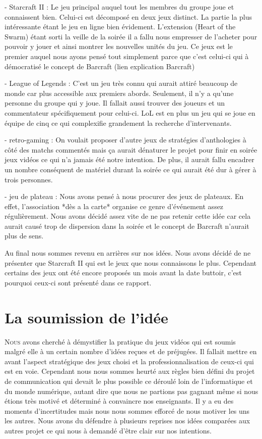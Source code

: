 - Starcraft II : Le jeu principal auquel tout les membres du groupe joue
et connaissent bien. Celui-ci est décomposé en deux jeux distinct.  La
partie la plus intéressante étant le jeu en ligne bien évidement.
L'extension (Heart of the Swarm) étant sorti la veille de la soirée il a
fallu nous empresser de l'acheter pour pouvoir y jouer et ainsi montrer
les nouvelles unités du jeu. Ce jeux est le premier auquel nous ayons
pensé tout simplement parce que c'est celui-ci qui à démocratisé le
concept de Barcraft (lien explication Barcraft)

- League of Legends : C'est un jeu très connu qui aurait attiré beaucoup
de monde car plus accessible aux premiers abords. Seulement, il n'y a
qu'une personne du groupe qui y joue. Il fallait aussi trouver des
joueurs et un commentateur spécifiquement pour celui-ci. LoL est en plus
un jeu qui se joue en équipe de cinq ce qui complexifie grandement la
recherche d'intervenants.

- retro-gaming : On voulait proposer d'autre jeux de stratégies
d'anthologies à côté des matchs commentés mais ça aurait dénaturer le
projet pour finir en soirée jeux vidéos ce qui n'a jamais été notre
intention. De plus, il aurait fallu encadrer un nombre conséquent de
matériel durant la soirée ce qui aurait été dur à gérer à trois
personnes.

- jeu de plateau : Nous avons pensé à nous procurer des jeux de
plateaux. En effet, l'association *dès a la carte* organise ce genre
d'événement assez régulièrement. Nous avons décidé assez vite de ne pas
retenir cette idée car cela aurait causé trop de dispersion dans la
soirée et le concept de Barcraft n'aurait plus de sens.

Au final nous sommes revenu en arrières sur nos idées. Nous avons décidé
de ne présenter que Starcraft II qui est le jeux que nous connaissons le
plus. Cependant certains des jeux ont été encore proposés un mois avant
la date buttoir, c'est pourquoi ceux-ci sont présenté dans ce rapport.

\section{La soumission de l'idée}%
\label{sec:la_soumission_de_leidee}

\lettrine{N}{ous} avons cherché à démystifier la pratique du jeux vidéos
qui est soumis malgré elle à un certain nombre d'idées reçues et de
préjugées.  Il fallait mettre en avant l'aspect stratégique des jeux
choisi et la professionnalisation de ceux-ci qui est en voie. Cependant
nous nous sommes heurté aux règles bien défini du projet de
communication qui devait le plus possible ce déroulé loin de
l'informatique et du monde numérique, autant dire que nous ne partions
pas gagnant même si nous étions très motivé et déterminé à convaincre
nos enseignants. Il y a eu des moments d'incertitudes mais nous nous
sommes efforcé de nous motiver les uns les autres. Nous avons du
défendre à plusieurs reprises nos idées comparées aux autres projet ce
qui nous à demandé d'être clair sur nos intentions.

